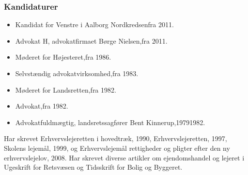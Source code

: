 \documentclass[11pt, a4paper]{awesome-cv}
\begin{document}
\begin{cvletter}
\subsubsection*{Kandidaturer}
\begin{itemize}
\item Kandidat for Venstre i Aalborg Nordkredsenfra 2011.
\end{itemize}
\begin{itemize}
\item Advokat H, advokatfirmaet Børge Nielsen,fra 2011.
\item Møderet for Højesteret,fra 1986.
\item Selvstændig advokatvirksomhed,fra 1983.
\item Møderet for Landsretten,fra 1982.
\item Advokat,fra 1982.
\item Advokatfuldmægtig, landsretssagfører Bent Kinnerup,19791982.
\end{itemize}
Har skrevet Erhvervslejeretten i hovedtræk, 1990, Erhvervslejeretten, 1997, Skolens lejemål, 1999, og Erhvervslejemål  rettigheder og pligter efter den ny erhvervslejelov, 2008. Har skrevet diverse artikler om ejendomshandel og lejeret i Ugeskrift for Retsvæsen og Tidsskrift for Bolig og Byggeret.

\end{cvletter}
\end{document}
